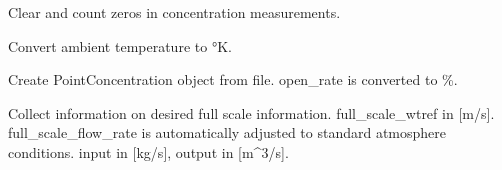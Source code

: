 \documentclass[letterpaper,10pt,english]{sphinxmanual}
\begin{document}
\begin{fulllineitems}
\begin{fulllineitems}
\end{fulllineitems}


\begin{fulllineitems}
\label{\detokenize{index:windtunnel.PointConcentration.clear_zeros}}
Clear and count zeros in concentration measurements.

\end{fulllineitems}


\begin{fulllineitems}
\label{\detokenize{index:windtunnel.PointConcentration.convert_temperature}}
Convert ambient temperature to °K.

\end{fulllineitems}


\begin{fulllineitems}
\label{\detokenize{index:windtunnel.PointConcentration.from_file}}
Create PointConcentration object from file. open\_rate is converted
to \%.

\end{fulllineitems}


\begin{fulllineitems}
\label{\detokenize{index:windtunnel.PointConcentration.full_scale_information}}
Collect information on desired full scale information.
full\_scale\_wtref in {[}m/s{]}. full\_scale\_flow\_rate is automatically
adjusted to standard atmosphere conditions.
input in {[}kg/s{]}, output in {[}m\textasciicircum{}3/s{]}.

\end{fulllineitems}



\end{fulllineitems}
\end{document}
